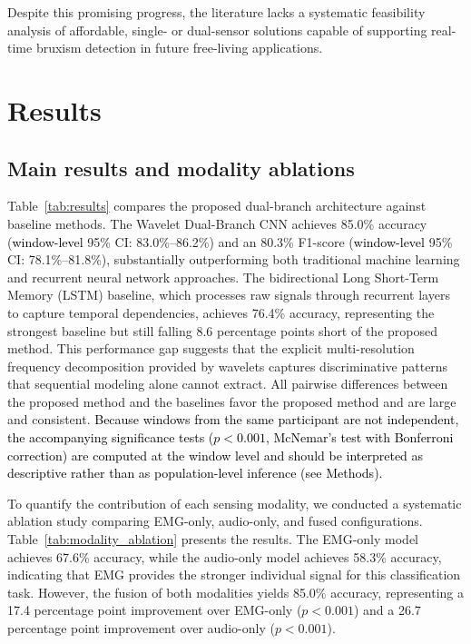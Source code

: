 \documentclass[pdflatex,sn-nature,iicol]{sn-jnl}
\newcommand{\rev}[1]{\textcolor{black}{#1}}
\begin{document}
Despite this promising progress, the literature lacks a systematic feasibility analysis of affordable, single- or dual-sensor solutions capable of supporting real-time bruxism detection in future free-living applications.


\section{Results}
\subsection{Main results and modality ablations}

Table~\ref{tab:results} compares the proposed dual-branch architecture against baseline methods. The Wavelet Dual-Branch CNN achieves 85.0\% accuracy (\rev{window-level} 95\% CI: 83.0\%--86.2\%) and an 80.3\% F1-score (\rev{window-level} 95\% CI: 78.1\%--81.8\%), substantially outperforming both traditional machine learning and recurrent neural network approaches. The bidirectional Long Short-Term Memory (LSTM) baseline, which processes raw signals through recurrent layers to capture temporal dependencies, achieves 76.4\% accuracy, representing the strongest baseline but still falling 8.6 percentage points short of the proposed method. This performance gap suggests that the explicit multi-resolution frequency decomposition provided by wavelets captures discriminative patterns that sequential modeling alone cannot extract. All pairwise differences between the proposed method and the baselines favor the proposed method and are large and consistent. \rev{Because windows from the same participant are not independent, the accompanying significance tests ($p < 0.001$, McNemar's test with Bonferroni correction) are computed at the window level and should be interpreted as descriptive rather than as population-level inference (see Methods).}

To quantify the contribution of each sensing modality, we conducted a systematic ablation study comparing EMG-only, audio-only, and fused configurations. Table~\ref{tab:modality_ablation} presents the results. The EMG-only model achieves 67.6\% accuracy, while the audio-only model achieves 58.3\% accuracy, indicating that EMG provides the stronger individual signal for this classification task. However, the fusion of both modalities yields 85.0\% accuracy, representing a 17.4 percentage point improvement over EMG-only ($p < 0.001$) and a 26.7 percentage point improvement over audio-only ($p < 0.001$).
\end{document}
